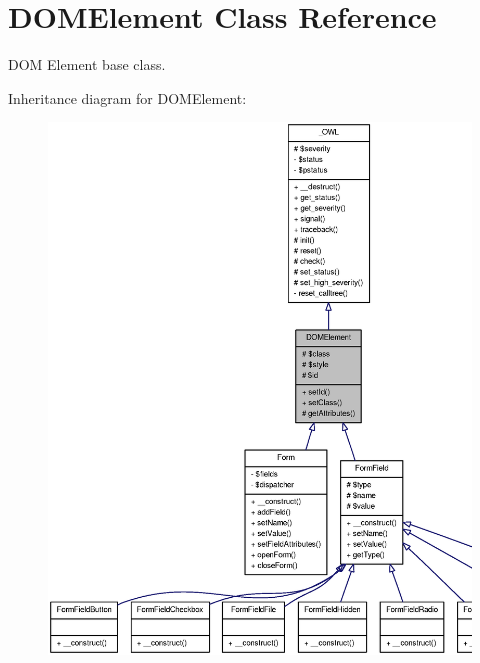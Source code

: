 \section{DOMElement Class Reference}
\label{classDOMElement}


DOM Element base class.  




Inheritance diagram for DOMElement:\nopagebreak
\begin{figure}[H]
\begin{center}
\leavevmode
\includegraphics[width=400pt]{classDOMElement__inherit__graph}
\end{center}
\end{figure}


